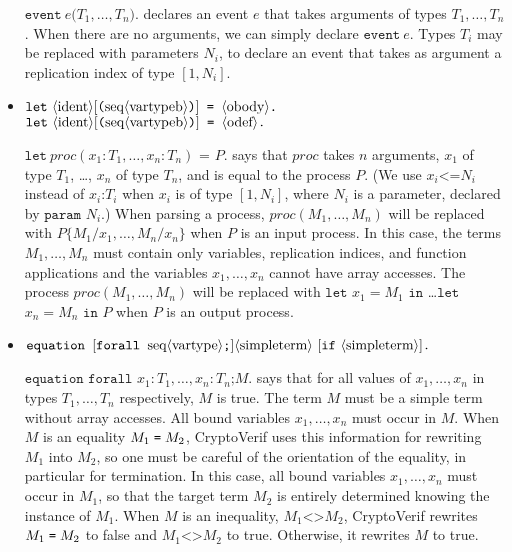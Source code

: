 \begin{itemize}
$\texttt{event}\ e\texttt{(}T_1, \ldots, T_n\texttt{)}\texttt{.}$
declares an event $e$ that takes arguments of types $T_1, \ldots, T_n$.
When there are no arguments, we can simply declare 
$\texttt{event}\ e\texttt{.}$ Types $T_i$ may be replaced with
parameters $N_i$, to declare an event that takes as argument
a replication index of type $[1,N_i]$.


\item $\texttt{let}\ \nonterm{ident}[\texttt{(}\seq{vartypeb}\texttt{)}]\texttt{ = }\oprocess\texttt{.}$\\
$\texttt{let}\ \nonterm{ident}[\texttt{(}\seq{vartypeb}\texttt{)}]\texttt{ = }\iprocess\texttt{.}$

$\texttt{let}\ \mathit{proc}(x_1:T_1, \dots, x_n:T_n)\texttt{ = }P\texttt{.}$ says that $\mathit{proc}$ takes $n$ arguments, $x_1$ of type $T_1$, \dots, $x_n$ of type $T_n$, and is equal to the process
$P$. (We use $x_i \texttt{<=} N_i$ instead of
  $x_i\texttt{:} T_i$ when $x_i$ is of type $[1,N_i]$, where $N_i$ is
  a parameter, declared by $\texttt{param }N_i$.)
When parsing a process, $\mathit{proc}(M_1, \dots, M_n)$ will be replaced with $P\{M_1/x_1, \dots, M_n/x_n\}$ when $P$ is an input process. In this case, the terms $M_1, \dots, M_n$ must contain only variables, replication indices, and function applications and the variables $x_1, \dots, x_n$ cannot have array accesses.
The process $\mathit{proc}(M_1, \dots, M_n)$ will be replaced with $\texttt{let}$ $x_1 = M_1$ $\texttt{in}$ \dots $\texttt{let}$ $x_n = M_n$ $\texttt{in}$ $P$ when $P$ is an output process.

\item $\texttt{equation }[\texttt{forall }\seq{vartype}\texttt{;}]\nonterm{simpleterm}\ [\texttt{if}\ \nonterm{simpleterm}]\texttt{.}$

$\texttt{equation forall }x_1:T_1, \ldots, x_n:T_n\texttt{;}M\texttt{.}$ says
that for all values of $x_1, \ldots, x_n$ in types $T_1, \ldots, T_n$
respectively,
$M$ is true. The term $M$ must be a simple term without array accesses.
All bound variables $x_1, \dots, x_n$ must occur in $M$.
%
When $M$ is an equality $M_1 \mathrel{\texttt{=}}  M_2$, CryptoVerif uses this information
for rewriting $M_1$ into $M_2$, so one must be careful of the orientation
of the equality, in particular for termination. 
In this case, all bound variables $x_1, \dots, x_n$ must occur in $M_1$,
so that the target term $M_2$ is entirely determined knowing the instance of $M_1$.
%
When $M$ is an inequality, $M_1 \texttt{<>} M_2$, CryptoVerif rewrites
$M_1 \mathrel{\texttt{=}}  M_2$ to false and $M_1 \texttt{<>} M_2$ to true.
%
Otherwise, it rewrites $M$ to true.


\end{itemize}

